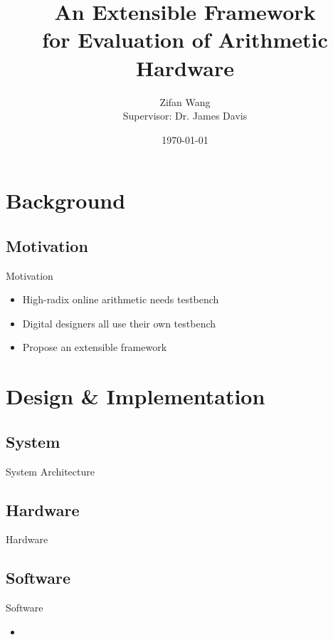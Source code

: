 \documentclass{beamer}
\title[EFEAH]{An Extensible Framework\\for Evaluation of Arithmetic Hardware}
\subtitle{}
\author[Zifan Wang]{Zifan Wang \texorpdfstring{\\}{} Supervisor: Dr. James Davis}
\institute[]{Imperial College London}
\date{\today}
\begin{document}
\begin{frame}
  \titlepage
\end{frame}

\begin{frame}
  \tableofcontents
\end{frame}

\section{Background}
\subsection{Motivation}
\begin{frame}{Motivation}
  \begin{itemize}
  \item High-radix online arithmetic needs testbench
  \item Digital designers all use their own testbench
  \item Propose an extensible framework
\end{itemize}
\end{frame}

\section{Design \& Implementation}
\subsection{System}
\begin{frame}[shrink]{System Architecture}
  \begin{figure}[H]
    \centering
    
    \label{Block}
  \end{figure}
\end{frame}

\subsection{Hardware}
\begin{frame}[shrink]{Hardware}
  \begin{figure}[H]
    \centering
    
    \label{DBlock}
  \end{figure}
\end{frame}

\subsection{Software}
\begin{frame}{Software}
\begin{itemize}
  \item 
\end{itemize}
\end{frame}
\end{document}
